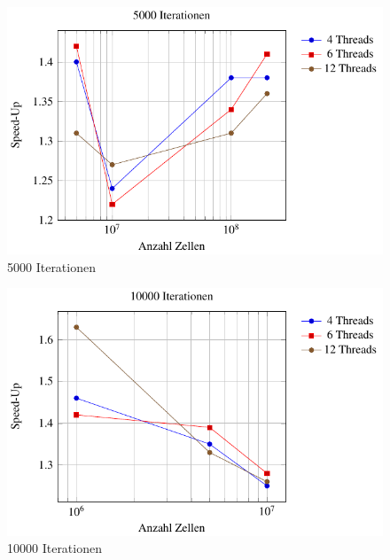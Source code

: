 	
	\begin{figure}
		\centering
		\includegraphics{papers/parallelisierung/images/speedup5000.pdf}
		\caption{5000 Iterationen}
		\label{parallelisierung:fig:Speedup5000}
	\end{figure}
	
	
	\begin{figure}
		\centering
		\includegraphics{papers/parallelisierung/images/speedup10000.pdf}
		\caption{10000 Iterationen}
		\label{parallelisierung:fig:Speedup10000}
	\end{figure}
	


